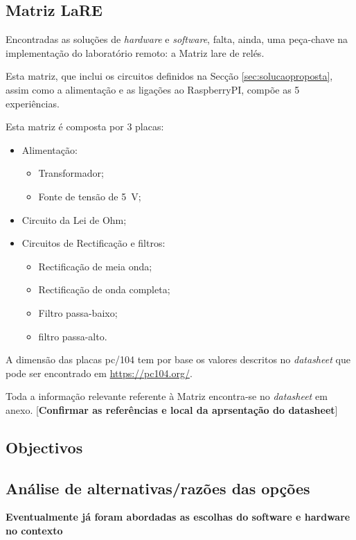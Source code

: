 \subsection{Matriz LaRE}
Encontradas as soluções de \textit{hardware} e \textit{software}, falta, ainda, uma peça-chave na implementação do \acrshort{laboratório remoto}: a Matriz \acrshort{lare} de relés.

Esta matriz, que inclui os circuitos definidos na Secção \ref{sec:solucaoproposta}, assim como a alimentação e as ligações ao \gls{RaspberryPI}, compõe as 5 experiências.

Esta matriz é composta por 3 placas:
\begin{itemize}
    \item Alimentação:
          \begin{itemize}
              \item Transformador;
              \item Fonte de tensão de \SI{5}{\volt};
          \end{itemize}
    \item Circuito da Lei de Ohm;
    \item Circuitos de Rectificação e filtros:
          \begin{itemize}
              \item Rectificação de meia onda;
              \item Rectificação de onda completa;
              \item Filtro passa-baixo;
              \item filtro passa-alto.
          \end{itemize}
\end{itemize}

A dimensão das placas \gls{pc/104} tem por base os valores descritos no \textit{datasheet} que pode ser encontrado em \url{https://pc104.org/}.

Toda a informação relevante referente à Matriz encontra-se no \textit{datasheet} em anexo. [\textbf{Confirmar as referências e local da aprsentação do datasheet}]

\subsection{Objectivos}
\subsection{Análise de alternativas/razões das opções}
\textbf{Eventualmente já foram abordadas as escolhas do software e hardware no contexto}

